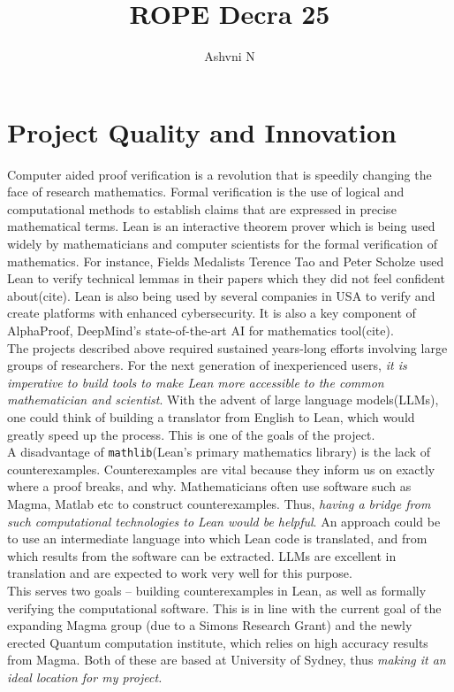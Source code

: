\documentclass[12pt,reqno,oneside]{amsart}
\title{ROPE Decra 25}
\author{Ashvni N}
\begin{document}
\noindent

\section{Project Quality and Innovation}
Computer aided proof verification is a revolution that is speedily changing the face of research mathematics. Formal verification is the use of logical and computational methods to establish claims that are expressed in precise mathematical terms. Lean is an interactive theorem prover which is being used widely by mathematicians and computer scientists for the formal verification of mathematics. For instance, Fields Medalists Terence Tao and Peter Scholze used Lean to verify technical lemmas in their papers which they did not feel confident about(cite). Lean is also being used by several companies in USA to verify and create platforms with enhanced cybersecurity. It is also a key component of AlphaProof, DeepMind’s state-of-the-art AI for mathematics tool(cite). \\

The projects described above required sustained years-long efforts involving large groups of researchers. For the next generation of inexperienced users, \textit{it is imperative to build tools to make Lean more accessible to the common mathematician and scientist}. With the advent of large language models(LLMs), one could think of building a translator from English to Lean, which would greatly speed up the process. This is one of the goals of the project. \\

A disadvantage of \texttt{mathlib}(Lean’s primary mathematics library) is the lack of counterexamples. Counterexamples are vital because they inform us on exactly where a proof breaks, and why. Mathematicians often use software such as Magma, Matlab etc to construct counterexamples. Thus, \textit{having a bridge from such computational technologies to Lean would be helpful}. An approach could be to use an intermediate language into which Lean code is translated, and from which results from the software can be extracted. LLMs are excellent in translation and are expected to work very well for this purpose. \\

This serves two goals – building counterexamples in Lean, as well as formally verifying the computational software. This is in line with the current goal of the expanding Magma group (due to a Simons Research Grant) and the newly erected Quantum computation institute, which relies on high accuracy results from Magma. Both of these are based at University of Sydney, thus \textit{making it an ideal location for my project.} \\
\end{document}
